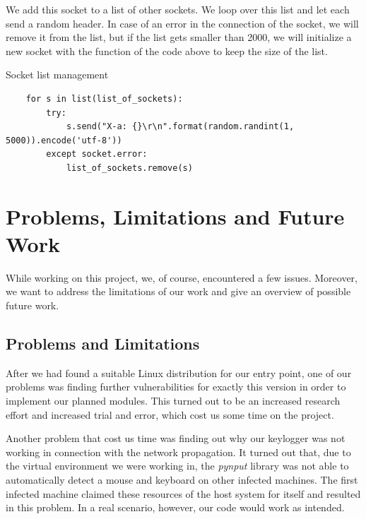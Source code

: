 We add this socket to a list of other sockets. We loop over this list and let each send a random header. In case of an error in the connection of the socket, we will remove it from the list, but if the list gets smaller than 2000, we will initialize a new socket with the function of the code above to keep the size of the list.

\begin{codesnippet}[H]
    \caption{Socket list management}
    \label{code:socket_list_management}
\end{codesnippet}
\vspace{-0.75cm}
\begin{lstlisting}
    for s in list(list_of_sockets):
        try:
            s.send("X-a: {}\r\n".format(random.randint(1, 5000)).encode('utf-8'))
        except socket.error:
            list_of_sockets.remove(s)
\end{lstlisting}


\section{Problems, Limitations and Future Work}
\label{sec:problems_and_future_work}

While working on this project, we, of course, encountered a few issues. Moreover, we want to address the limitations of our work and give an overview of possible future work.


\subsection{Problems and Limitations}
\label{sec:problems_and_limitations}

After we had found a suitable Linux distribution for our entry point, one of our problems was finding further vulnerabilities for exactly this version in order to implement our planned modules. This turned out to be an increased research effort and increased trial and error, which cost us some time on the project.

Another problem that cost us time was finding out why our keylogger was not working in connection with the network propagation. It turned out that, due to the virtual environment we were working in, the \textit{pynput} library was not able to automatically detect a mouse and keyboard on other infected machines. The first infected machine claimed these resources of the host system for itself and resulted in this problem. In a real scenario, however, our code would work as intended.

